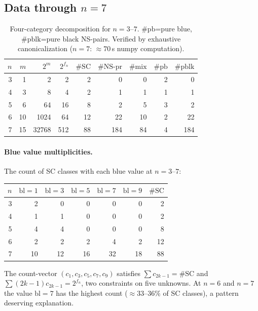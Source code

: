 \documentclass[12pt,reqno]{amsart}
\theoremstyle{definition}
\theoremstyle{plain}
\begin{document}
\subsection{Data through $n=7$}

\begin{table}[h]
\centering\small
\begin{tabular}{r|rrr|rrr|r|r}
\hline
$n$ & $m$ & $2^m$ & $2^{f_n}$ & $\#\mathrm{SC}$ & $\#\mathrm{NS\text{-}pr}$ & $\#\mathrm{mix}$ & $\#\mathrm{pb}$ & $\#\mathrm{pblk}$ \\
\hline
3 & 1 & 2 & 2 & 2 & 0 & 0 & 2 & 0 \\
4 & 3 & 8 & 4 & 2 & 1 & 1 & 1 & 1 \\
5 & 6 & 64 & 16 & 8 & 2 & 5 & 3 & 2 \\
6 & 10 & 1024 & 64 & 12 & 22 & 10 & 2 & 22 \\
7 & 15 & 32768 & 512 & 88 & 184 & 84 & 4 & 184 \\
\hline
\end{tabular}
\caption{Four-category decomposition for $n=3$--$7$.
$\#\mathrm{pb}$=pure blue, $\#\mathrm{pblk}$=pure black NS-pairs.
Verified by exhaustive canonicalization ($n=7$: $\approx70$\,s numpy computation).}
\label{tab:four-cat}
\end{table}

\paragraph{Blue value multiplicities.}
The count of SC classes with each blue value at $n=3$--$7$:
\begin{center}
\begin{tabular}{r|rrrrr|r}
\hline
$n$ & $\mathrm{bl}{=}1$ & $\mathrm{bl}{=}3$ & $\mathrm{bl}{=}5$ & $\mathrm{bl}{=}7$ & $\mathrm{bl}{=}9$ & $\#\mathrm{SC}$ \\
\hline
3 & 2 & 0 & 0 & 0 & 0 & 2 \\
4 & 1 & 1 & 0 & 0 & 0 & 2 \\
5 & 4 & 4 & 0 & 0 & 0 & 8 \\
6 & 2 & 2 & 2 & 4 & 2 & 12 \\
7 & 10 & 12 & 16 & 32 & 18 & 88 \\
\hline
\end{tabular}
\end{center}
The count-vector $(c_1,c_3,c_5,c_7,c_9)$ satisfies $\sum c_{2k-1}=\#\mathrm{SC}$
and $\sum(2k-1)c_{2k-1}=2^{f_n}$, two constraints on five unknowns.
At $n=6$ and $n=7$ the value $\mathrm{bl}=7$ has the highest count ($\approx33\text{--}36\%$
of SC classes), a pattern deserving explanation.
\end{document}
